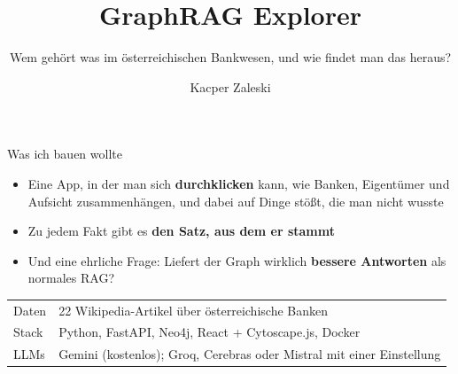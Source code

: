 \documentclass[aspectratio=169,11pt]{beamer}
\title{GraphRAG Explorer}
\subtitle{Wem gehört was im österreichischen Bankwesen, und wie findet man das heraus?}
\author{Kacper Zaleski}
\date{}
\newcommand{\hl}[1]{\textcolor{midblue}{\textbf{#1}}}
\begin{document}
\begin{frame}
  \titlepage
\end{frame}

\begin{frame}{Was ich bauen wollte}
  \begin{itemize}
    \item Eine App, in der man sich \hl{durchklicken} kann, wie Banken, Eigentümer und Aufsicht
          zusammenhängen, und dabei auf Dinge stößt, die man nicht wusste
    \item Zu jedem Fakt gibt es \hl{den Satz, aus dem er stammt}
    \item Und eine ehrliche Frage: Liefert der Graph wirklich \hl{bessere Antworten} als normales RAG?
  \end{itemize}
  \vspace{8pt}
  \small
  \begin{tabular}{ll}
    Daten & 22 Wikipedia-Artikel über österreichische Banken \\
    Stack & Python, FastAPI, Neo4j, React + Cytoscape.js, Docker \\
    LLMs & Gemini (kostenlos); Groq, Cerebras oder Mistral mit einer Einstellung \\
  \end{tabular}
\end{frame}
\end{document}
